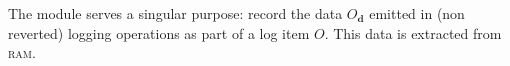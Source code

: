 The \logDataMod{} module serves a singular purpose: record the data $O_\textbf{d}$ emitted in (non reverted) logging operations as part of a log item $O$. This data is extracted from \textsc{ram}.

